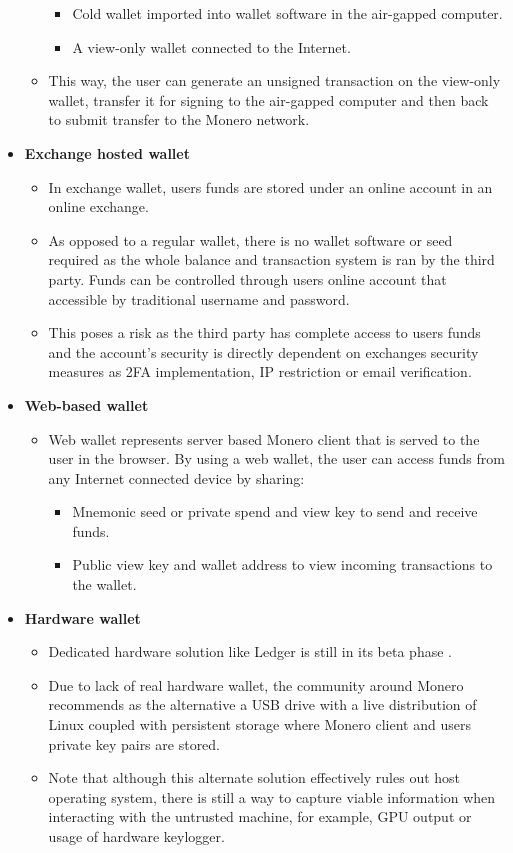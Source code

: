 \documentclass[
  printed, %
  table,   %
  nolof,     %
  nolot,     %
           oneside, color
]{fithesis3}
\begin{document}
\begin{itemize}
\begin{itemize}
\begin{itemize}
\item Cold wallet imported into wallet software in the air-gapped computer.
\item A view-only wallet connected to the Internet. 
\end{itemize}
\item This way, the user can generate an unsigned transaction on the view-only wallet, transfer it for signing to the air-gapped computer and then back to submit transfer to the Monero network.
\end{itemize}
\item \textbf{Exchange hosted wallet}
\begin{itemize}\itemsep0em
\item In exchange wallet, users funds are stored under an online account in an online exchange. 
\item As opposed to a regular wallet, there is no wallet software or seed required as the whole balance and transaction system is ran by the third party.
Funds can be controlled through users online account that accessible by traditional username and password. 
\item This poses a risk as the third party has complete access to users funds and the account's security is directly dependent on exchanges security measures as 2FA implementation, IP restriction or email verification.
\end{itemize}
\item \textbf{Web-based wallet}
\begin{itemize}\itemsep0em
\item Web wallet represents server based Monero client that is served to the user in the browser. By using a web wallet, the user can access funds from any Internet connected device by sharing:
\begin{itemize}\itemsep0em
\item Mnemonic seed or private spend and view key to send and receive funds.
\item Public view key and wallet address to view incoming transactions to the wallet.
\end{itemize}
\end{itemize}
\item \textbf{Hardware wallet}
\begin{itemize}\itemsep0em
\item Dedicated hardware solution like Ledger is still in its beta phase \cite{ledgermonero}.
\item Due to lack of real hardware wallet, the community around Monero recommends as the alternative a USB drive with a live distribution of Linux coupled with persistent storage where Monero client and users private key pairs are stored. 
\item Note that although this alternate solution effectively rules out host operating system, there is still a way to capture viable information when interacting with the untrusted machine, for example, GPU output or usage of hardware keylogger.

\end{itemize}
\end{itemize} 
\end{document}
